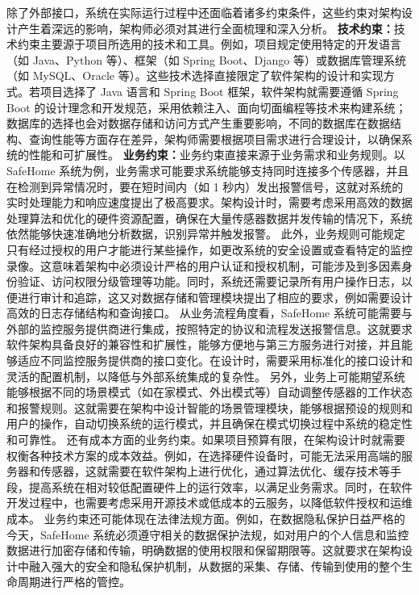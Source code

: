 除了外部接口，系统在实际运行过程中还面临着诸多约束条件，这些约束对架构设计产生着深远的影响，架构师必须对其进行全面梳理和深入分析。 \textbf{技术约束：}技术约束主要源于项目所选用的技术和工具。例如，项目规定使用特定的开发语言（如
Java、Python 等）、框架（如 Spring Boot、Django 等）或数据库管理系统（如 MySQL、Oracle 等）。这些技术选择直接限定了软件架构的设计和实现方式。若项目选择了 Java 语言和 Spring Boot
框架，软件架构就需要遵循 Spring Boot
的设计理念和开发规范，采用依赖注入、面向切面编程等技术来构建系统；数据库的选择也会对数据存储和访问方式产生重要影响，不同的数据库在数据结构、查询性能等方面存在差异，架构师需要根据项目需求进行合理设计，以确保系统的性能和可扩展性。
\textbf{业务约束：}业务约束直接来源于业务需求和业务规则。以 SafeHome 系统为例，业务需求可能要求系统能够支持同时连接多个传感器，并且在检测到异常情况时，要在短时间内（如 1
秒内）发出报警信号，这就对系统的实时处理能力和响应速度提出了极高要求。架构设计时，需要考虑采用高效的数据处理算法和优化的硬件资源配置，确保在大量传感器数据并发传输的情况下，系统依然能够快速准确地分析数据，识别异常并触发报警。
此外，业务规则可能规定只有经过授权的用户才能进行某些操作，如更改系统的安全设置或查看特定的监控录像。这意味着架构中必须设计严格的用户认证和授权机制，可能涉及到多因素身份验证、访问权限分级管理等功能。同时，系统还需要记录所有用户操作日志，以便进行审计和追踪，这又对数据存储和管理模块提出了相应的要求，例如需要设计高效的日志存储结构和查询接口。
从业务流程角度看，SafeHome
系统可能需要与外部的监控服务提供商进行集成，按照特定的协议和流程发送报警信息。这就要求软件架构具备良好的兼容性和扩展性，能够方便地与第三方服务进行对接，并且能够适应不同监控服务提供商的接口变化。在设计时，需要采用标准化的接口设计和灵活的配置机制，以降低与外部系统集成的复杂性。
另外，业务上可能期望系统能够根据不同的场景模式（如在家模式、外出模式等）自动调整传感器的工作状态和报警规则。这就需要在架构中设计智能的场景管理模块，能够根据预设的规则和用户的操作，自动切换系统的运行模式，并且确保在模式切换过程中系统的稳定性和可靠性。
还有成本方面的业务约束。如果项目预算有限，在架构设计时就需要权衡各种技术方案的成本效益。例如，在选择硬件设备时，可能无法采用高端的服务器和传感器，这就需要在软件架构上进行优化，通过算法优化、缓存技术等手段，提高系统在相对较低配置硬件上的运行效率，以满足业务需求。同时，在软件开发过程中，也需要考虑采用开源技术或低成本的云服务，以降低软件授权和运维成本。
业务约束还可能体现在法律法规方面。例如，在数据隐私保护日益严格的今天，SafeHome
系统必须遵守相关的数据保护法规，如对用户的个人信息和监控数据进行加密存储和传输，明确数据的使用权限和保留期限等。这就要求在架构设计中融入强大的安全和隐私保护机制，从数据的采集、存储、传输到使用的整个生命周期进行严格的管控。
